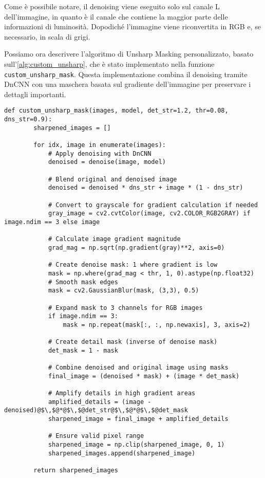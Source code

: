 Come è possibile notare, il denoising viene eseguito solo sul canale L dell'immagine, in quanto è il canale che contiene la maggior parte delle informazioni di luminosità. Dopodiché l'immagine viene riconvertita in RGB e, se necessario, in scala di grigi.

Possiamo ora descrivere l'algoritmo di Unsharp Masking personalizzato, basato sull'\cref{alg:custom_unsharp}, che è stato implementato nella funzione \texttt{custom\_unsharp\_mask}. Questa implementazione combina il denoising tramite DnCNN con una maschera basata sul gradiente dell'immagine per preservare i dettagli importanti.

\begin{lstlisting}[label={lst:unsharp_mask}]
    def custom_unsharp_mask(images, model, det_str=1.2, thr=0.08, dns_str=0.9):
        sharpened_images = []

        for idx, image in enumerate(images):
            # Apply denoising with DnCNN
            denoised = denoise(image, model)
            
            # Blend original and denoised image
            denoised = denoised * dns_str + image * (1 - dns_str)

            # Convert to grayscale for gradient calculation if needed
            gray_image = cv2.cvtColor(image, cv2.COLOR_RGB2GRAY) if image.ndim == 3 else image
            
            # Calculate image gradient magnitude
            grad_mag = np.sqrt(np.gradient(gray)**2, axis=0)

            # Create denoise mask: 1 where gradient is low
            mask = np.where(grad_mag < thr, 1, 0).astype(np.float32)
            # Smooth mask edges
            mask = cv2.GaussianBlur(mask, (3,3), 0.5)

            # Expand mask to 3 channels for RGB images
            if image.ndim == 3:
                mask = np.repeat(mask[:, :, np.newaxis], 3, axis=2)

            # Create detail mask (inverse of denoise mask)
            det_mask = 1 - mask

            # Combine denoised and original image using masks
            final_image = (denoised * mask) + (image * det_mask)

            # Amplify details in high gradient areas
            amplified_details = (image - denoised)@$\,$@*@$\,$@det_str@$\,$@*@$\,$@det_mask
            sharpened_image = final_image + amplified_details

            # Ensure valid pixel range
            sharpened_image = np.clip(sharpened_image, 0, 1)
            sharpened_images.append(sharpened_image)

        return sharpened_images
\end{lstlisting}

